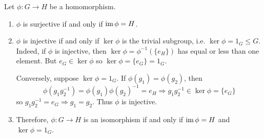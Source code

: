 \documentclass[10pt, a4paper, twoside]{report}
\begin{document}
\begin{remark} Let \(\phi:G\to H\) be a homomorphism.
    \begin{enumerate}
        \item \(\phi\) is surjective if and only if \(\operatorname{im}\phi=H\).
        \item \(\phi\) is injective if and only if \(\ker\phi\) is the trivial subgroup, i.e. \(\ker\phi=1_G\leq G\). Indeed, if \(\phi\) is injective, then \(\ker\phi=\phi^{-1}(\{e_H\})\) has equal or less than one element. But \(e_G\in\ker\phi\) so \(\ker\phi=\{e_G\}=1_G\).
        
        Conversely, suppose \(\ker\phi=1_G\). If \(\phi(g_1)=\phi(g_2)\), then 
        \[\phi(g_1g_2^{-1})=\phi(g_1)\phi(g_2)^{-1}=e_H\Rightarrow g_1g_2^{-1}\in\ker\phi=\{e_G\}\]
        so \(g_1g_2^{-1}=e_G\Rightarrow g_1=g_2\). Thus \(\phi\) is injective.
        \item Therefore, \(\phi:G\to H\) is an isomorphism if and only if \(\operatorname{im}\phi=H\) and \(\ker\phi=1_G\).
    \end{enumerate}
\end{remark}
\end{document}
